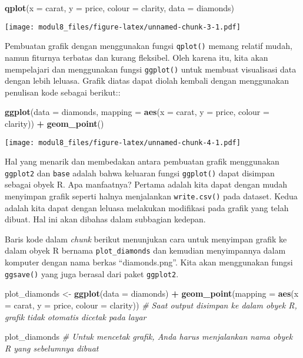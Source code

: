 \documentclass[
]{article}
\newenvironment{Shaded}{\begin{snugshade}}{\end{snugshade}}
\newcommand{\CommentTok}[1]{\textcolor[rgb]{0.56,0.35,0.01}{\textit{#1}}}
\newcommand{\DataTypeTok}[1]{\textcolor[rgb]{0.13,0.29,0.53}{#1}}
\newcommand{\KeywordTok}[1]{\textcolor[rgb]{0.13,0.29,0.53}{\textbf{#1}}}
\newcommand{\NormalTok}[1]{#1}
\newcommand{\OperatorTok}[1]{\textcolor[rgb]{0.81,0.36,0.00}{\textbf{#1}}}
\newcommand{\StringTok}[1]{\textcolor[rgb]{0.31,0.60,0.02}{#1}}
\begin{document}
\begin{Shaded}
\begin{Highlighting}[]
\KeywordTok{qplot}\NormalTok{(}\DataTypeTok{x =}\NormalTok{ carat, }\DataTypeTok{y =}\NormalTok{ price, }\DataTypeTok{colour =}\NormalTok{  clarity, }\DataTypeTok{data =}\NormalTok{ diamonds)}
\end{Highlighting}
\end{Shaded}

\texttt{[image: modul8\_files/figure-latex/unnamed-chunk-3-1.pdf]}

Pembuatan grafik dengan menggunakan fungsi \texttt{qplot()} memang
relatif mudah, namun fiturnya terbatas dan kurang fleksibel. Oleh karena
itu, kita akan mempelajari dan menggunakan fungsi \texttt{ggplot()}
untuk membuat visualisasi data dengan lebih leluasa. Grafik diatas dapat
diolah kembali dengan menggunakan penulisan kode sebagai berikut::

\begin{Shaded}
\begin{Highlighting}[]
\KeywordTok{ggplot}\NormalTok{(}\DataTypeTok{data =}\NormalTok{ diamonds, }\DataTypeTok{mapping =} \KeywordTok{aes}\NormalTok{(}\DataTypeTok{x =}\NormalTok{ carat, }\DataTypeTok{y =}\NormalTok{ price, }\DataTypeTok{colour =}\NormalTok{ clarity)) }\OperatorTok{+}
\StringTok{  }\KeywordTok{geom_point}\NormalTok{()}
\end{Highlighting}
\end{Shaded}

\texttt{[image: modul8\_files/figure-latex/unnamed-chunk-4-1.pdf]}

Hal yang menarik dan membedakan antara pembuatan grafik menggunakan
\texttt{ggplot2} dan \texttt{base} adalah bahwa keluaran fungsi
\texttt{ggplot()} dapat disimpan sebagai obyek R. Apa manfaatnya?
Pertama adalah kita dapat dengan mudah menyimpan grafik seperti halnya
menjalankan \texttt{write.csv()} pada dataset. Kedua adalah kita dapat
dengan leluasa melakukan modifikasi pada grafik yang telah dibuat. Hal
ini akan dibahas dalam subbagian kedepan.

Baris kode dalam \emph{chunk} berikut menunjukan cara untuk menyimpan
grafik ke dalam obyek R bernama \texttt{plot\_diamonds} dan kemudian
menyimpannya dalam komputer dengan nama berkas ``diamonds.png''. Kita
akan menggunakan fungsi \texttt{ggsave()} yang juga berasal dari paket
\texttt{ggplot2}.

\begin{Shaded}
\begin{Highlighting}[]
\NormalTok{plot_diamonds <-}\StringTok{ }\KeywordTok{ggplot}\NormalTok{(}\DataTypeTok{data =}\NormalTok{ diamonds) }\OperatorTok{+}
\StringTok{  }\KeywordTok{geom_point}\NormalTok{(}\DataTypeTok{mapping =} \KeywordTok{aes}\NormalTok{(}\DataTypeTok{x =}\NormalTok{ carat, }\DataTypeTok{y =}\NormalTok{ price, }\DataTypeTok{colour =}\NormalTok{ clarity)) }\CommentTok{# Saat output disimpan ke dalam obyek R, grafik tidak otomatis dicetak pada layar}

\NormalTok{plot_diamonds }\CommentTok{# Untuk mencetak grafik, Anda harus menjalankan nama obyek R yang sebelumnya dibuat}
\end{Highlighting}
\end{Shaded}
\end{document}
